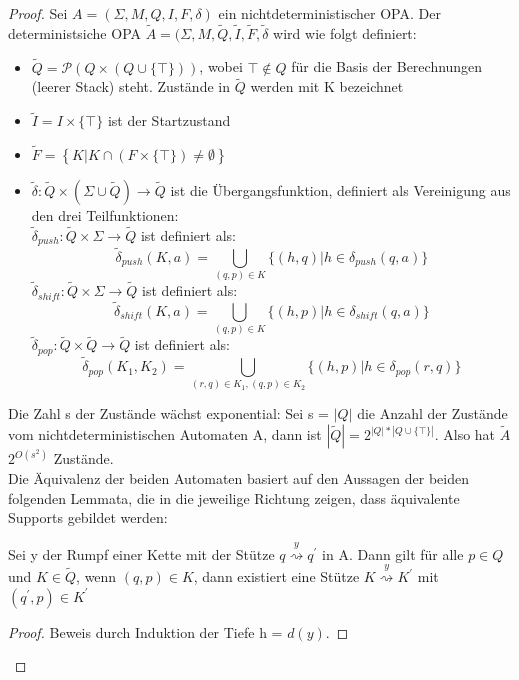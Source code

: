 \begin{proof}
Sei $A=(\Sigma, M, Q, I, F, \delta)$ ein nichtdeterministischer OPA. Der deterministsiche OPA $\tilde{A}=(\Sigma, M, \tilde{Q}, \tilde{I}, \tilde{F}, \tilde{\delta}$ wird wie folgt definiert:
\begin{itemize}
\item
$\tilde{Q} = \mathcal{P}(Q \times (Q \cup \{\top\}))$, wobei $\top \notin Q$ für die Basis der Berechnungen (leerer Stack) steht. Zustände in $\tilde{Q}$ werden mit K bezeichnet
\item
$\tilde{I}=I\times \{\top \}$ ist der Startzustand
\item
$\tilde{F}=\left\{K|K \cap (F \times \{\top\}) \neq \emptyset\right\}$
\item
$\tilde{\delta}: \tilde{Q} \times (\Sigma \cup \tilde{Q})\rightarrow \tilde{Q}$ ist die Übergangsfunktion, definiert als Vereinigung aus den drei Teilfunktionen:\\[2ex]
$\tilde{\delta}_{push}: \tilde{Q} \times \Sigma \rightarrow \tilde{Q}$ ist definiert als: 
\begin{equation*}
\tilde{\delta}_{push}(K, a) = \bigcup\limits_{(q,p) \in K} \{(h,q)|h \in \delta_{push}(q,a)\}
\end{equation*}
$\tilde{\delta}_{shift}: \tilde{Q} \times \Sigma \rightarrow \tilde{Q}$ ist definiert als: 
\begin{equation*}
\tilde{\delta}_{shift}(K, a) = \bigcup\limits_{(q,p) \in K} \{(h,p)|h \in \delta_{shift}(q,a)\}
\end{equation*}
$\tilde{\delta}_{pop}: \tilde{Q} \times \tilde{Q}\rightarrow \tilde{Q}$ ist definiert als: 
\begin{equation*}
\tilde{\delta}_{pop}(K_1, K_2) = \bigcup\limits_{(r,q) \in K_1, (q,p)\in K_2} \{(h,p)|h \in \delta_{pop}(r,q)\}
\end{equation*}
\end{itemize}
Die Zahl s der Zustände wächst exponential: Sei s = $|Q|$ die Anzahl der Zustände vom nichtdeterministischen Automaten A, dann ist $|\tilde{Q}| = 2^{|Q| * |Q \cup \{\top\}|}$. Also hat $\tilde{A}$  $2^{O(s^2)}$ Zustände.\\
Die Äquivalenz der beiden Automaten basiert auf den Aussagen der beiden folgenden Lemmata, die in die jeweilige Richtung zeigen, dass äquivalente Supports gebildet werden:
\begin{lemma}
Sei y der Rumpf einer Kette mit der Stütze $q\stackrel{y}{\rightsquigarrow} q^\prime$ in A. Dann gilt für alle $p \in Q$ und $K \in \tilde{Q}$, wenn $(q,p) \in K$, dann existiert eine Stütze $K\stackrel{y}{\rightsquigarrow} K^\prime$ mit $(q^\prime, p) \in K^\prime $
\end{lemma}
\begin{proof}
\label{lemma_deter1}
Beweis durch Induktion der Tiefe h = $d(y)$. 

\end{proof}
\end{proof}
